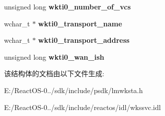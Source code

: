 \begin{DoxyCompactItemize}
\item 
\mbox{\label{struct___w_k_s_t_a___t_r_a_n_s_p_o_r_t___i_n_f_o__0_a1b9db55865769d3630bc1bc5b621b7e8}} 
unsigned long {\bfseries wkti0\+\_\+number\+\_\+of\+\_\+vcs}
\item 
\mbox{\label{struct___w_k_s_t_a___t_r_a_n_s_p_o_r_t___i_n_f_o__0_af5e0164c1e07507129f1e309cd3f1bbe}} 
wchar\+\_\+t $\ast$ {\bfseries wkti0\+\_\+transport\+\_\+name}
\item 
\mbox{\label{struct___w_k_s_t_a___t_r_a_n_s_p_o_r_t___i_n_f_o__0_a20a7347980f08e061945f013312e9b61}} 
wchar\+\_\+t $\ast$ {\bfseries wkti0\+\_\+transport\+\_\+address}
\item 
\mbox{\label{struct___w_k_s_t_a___t_r_a_n_s_p_o_r_t___i_n_f_o__0_a938fd305780b1debc36e546ec666168f}} 
unsigned long {\bfseries wkti0\+\_\+wan\+\_\+ish}
\end{DoxyCompactItemize}


该结构体的文档由以下文件生成\+:\begin{DoxyCompactItemize}
\item 
E\+:/\+React\+O\+S-\/0../sdk/include/psdk/lmwksta.\+h\item 
E\+:/\+React\+O\+S-\/0../sdk/include/reactos/idl/wkssvc.\+idl\end{DoxyCompactItemize}
